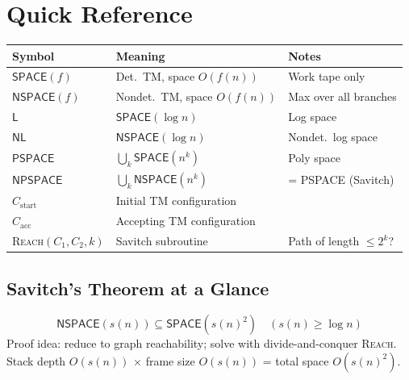 \documentclass[12pt,a4paper]{article}
\theoremstyle{plain}
\theoremstyle{definition}
\theoremstyle{remark}
\newcommand{\SPACE}{\mathsf{SPACE}}
\newcommand{\NSPACE}{\mathsf{NSPACE}}
\newcommand{\PSPACE}{\mathsf{PSPACE}}
\newcommand{\NPSPACE}{\mathsf{NPSPACE}}
\newcommand{\NL}{\mathsf{NL}}
\newcommand{\LL}{\mathsf{L}}
\begin{document}
\appendix
\section{Quick Reference}

\begin{center}
\renewcommand{\arraystretch}{1.5}
\begin{tabular}{lll}
\toprule
\textbf{Symbol} & \textbf{Meaning} & \textbf{Notes} \\
\midrule
$\SPACE(f)$ & Det.\ TM, space $O(f(n))$ & Work tape only \\
$\NSPACE(f)$ & Nondet.\ TM, space $O(f(n))$ & Max over all branches \\
$\LL$ & $\SPACE(\log n)$ & Log space \\
$\NL$ & $\NSPACE(\log n)$ & Nondet.\ log space \\
$\PSPACE$ & $\bigcup_k \SPACE(n^k)$ & Poly space \\
$\NPSPACE$ & $\bigcup_k \NSPACE(n^k)$ & = PSPACE (Savitch) \\
$C_{\text{start}}$ & Initial TM configuration & \\
$C_{\text{acc}}$ & Accepting TM configuration & \\
\textsc{Reach}$(C_1,C_2,k)$ & Savitch subroutine & Path of length $\leq 2^k$? \\
\bottomrule
\end{tabular}
\end{center}

\subsection{Savitch's Theorem at a Glance}

\begin{tcolorbox}[colback=lightgreen, colframe=darkgreen, arc=6pt, boxrule=1.5pt]
\centering
\Large
\[
  \NSPACE(s(n)) \subseteq \SPACE(s(n)^2) \quad (s(n) \geq \log n)
\]
\normalsize
Proof idea: reduce to graph reachability; solve with divide-and-conquer \textsc{Reach}.\\
Stack depth $O(s(n))$ $\times$ frame size $O(s(n))$ = total space $O(s(n)^2)$.
\end{tcolorbox}
\end{document}
